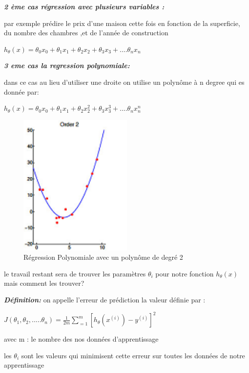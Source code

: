 \textbf{\emph{2 ème cas régression avec plusieurs variables :}}

par exemple prédire le prix d'une maison cette fois en fonction de la superficie, du nombre des chambres ,et de l'année de construction

${h}_{\theta}\left(x\right)={\theta }_{0}{x}_{0}+{\theta }_{1}{x}_{1}+{\theta }_{2}{x}_{2}+{\theta }_{3}{x}_{3}+....{\theta }_{n}{x}_{n}$

\textbf{\emph{3 eme cas la regression polynomiale:}}

dans ce cas au lieu d'utiliser une droite on utilise un polynôme à n degree qui es donnée par:

${h}_{\theta}\left(x\right)={\theta }_{0}{x}_{0}+{\theta }_{1}{x}_{1}+{\theta }_{2}{x}_{2}^{2}+{\theta }_{3}{x}_{3}^{3}+....{\theta }_{n}{x}_{n}^{n}$
\begin{figure}[ht]
	\centering
	\includegraphics[width=0.5\textwidth]{fig/regressionPlokynome.png}
	\caption[Short caption]{Régression Polynomiale avec un polynôme de degré 2}
	\label{fig:imageGraph}
\end{figure}
le travail restant sera de trouver les paramètres ${\theta }_{i}$ pour notre fonction  ${h}_{\theta}\left(x\right)$ mais comment les trouver?

\textbf{\emph{Définition:}}
on appelle l'erreur de prédiction la valeur définie par   :

 $J\left({\theta }_{1},{\theta }_{2},.....{\theta }_{n}\right)=\frac{1}{2m}\sum _{=1}^{m}{\left[{h}_{\theta}\left({x}^{(i)}\right) - {y}^{(i)}\right]}^2$
 
 
 avec m : le nombre des nos données d'apprentissage
 
 les  ${\theta }_{i}$ sont les valeurs qui minimisent cette erreur sur toutes les données de notre apprentissage
 
